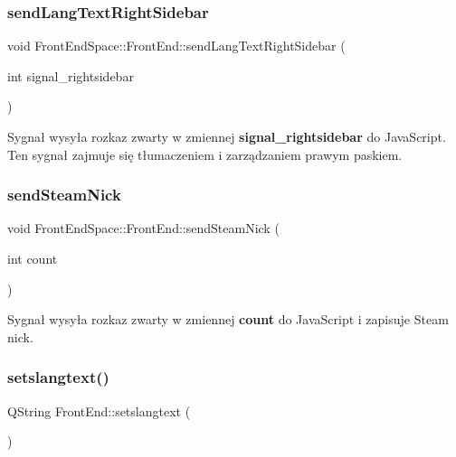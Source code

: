 \subsubsection{\texorpdfstring{send\+Lang\+Text\+Right\+Sidebar}{sendLangTextRightSidebar}}
{\footnotesize\ttfamily void Front\+End\+Space\+::\+Front\+End\+::send\+Lang\+Text\+Right\+Sidebar (\begin{DoxyParamCaption}\item[{int}]{signal\+\_\+rightsidebar }\end{DoxyParamCaption})\hspace{0.3cm}{\ttfamily [signal]}}

Sygnał wysyła rozkaz zwarty w zmiennej {\bfseries signal\+\_\+rightsidebar} do Java\+Script. Ten sygnał zajmuje się tłumaczeniem i zarządzaniem prawym paskiem. \mbox{\label{class_front_end_space_1_1_front_end_a4e5b30b73f05767648e40d7a6975309b}} 
\subsubsection{\texorpdfstring{send\+Steam\+Nick}{sendSteamNick}}
{\footnotesize\ttfamily void Front\+End\+Space\+::\+Front\+End\+::send\+Steam\+Nick (\begin{DoxyParamCaption}\item[{int}]{count }\end{DoxyParamCaption})\hspace{0.3cm}{\ttfamily [signal]}}

Sygnał wysyła rozkaz zwarty w zmiennej {\bfseries count} do Java\+Script i zapisuje Steam nick. \mbox{\label{class_front_end_space_1_1_front_end_addd3e353025e289f3c4459ba31509b92}} 
\subsubsection{\texorpdfstring{setslangtext()}{setslangtext()}}
{\footnotesize\ttfamily Q\+String Front\+End\+::setslangtext (\begin{DoxyParamCaption}{ }\end{DoxyParamCaption})}


